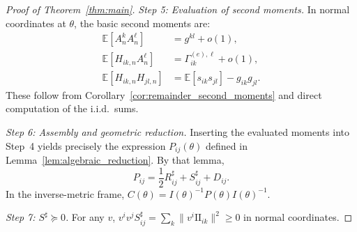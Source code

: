 \documentclass[11pt,letterpaper]{amsart}
\newcommand{\E}{\mathbb{E}}
\numberwithin{equation}{section}
\theoremstyle{plain}
\theoremstyle{definition}
\theoremstyle{remark}
\begin{document}
\begin{proof}[Proof of Theorem~\ref{thm:main}]
\textit{Step 5: Evaluation of second moments.}
In normal coordinates at $\theta$, the basic second moments are:
\begin{align*}
\E[A_n^kA_n^\ell]&=g^{kl}+o(1),\\
\E[H_{ik,n}A_n^\ell]&=\Gamma^{(e),\ell}_{ik}+o(1),\\
\E[H_{ik,n}H_{jl,n}]&=\E[s_{ik}s_{jl}]-g_{ik}g_{jl}.
\end{align*}
These follow from Corollary~\ref{cor:remainder_second_moments} and direct computation of the i.i.d.\ sums.

\textit{Step 6: Assembly and geometric reduction.}
Inserting the evaluated moments into Step~4 yields precisely the expression $P_{ij}(\theta)$ defined in Lemma~\ref{lem:algebraic_reduction}. By that lemma,
\[
P_{ij}=\frac12 R^\sharp_{ij}+S^\sharp_{ij}+D_{ij}.
\]
In the inverse-metric frame, $C(\theta)=I(\theta)^{-1}P(\theta)I(\theta)^{-1}$.

\textit{Step 7: $S^\sharp\succeq 0$.}
For any $v$, $v^iv^jS^\sharp_{ij}=\sum_k\|v^i\mathrm{II}_{ik}\|^2\ge 0$ in normal coordinates.
\end{proof}

\end{document}
